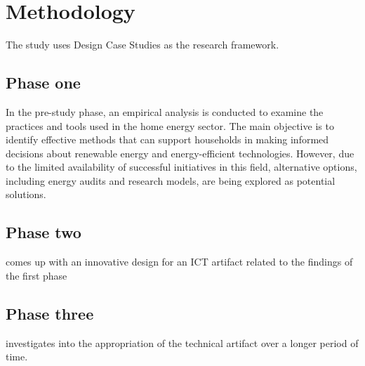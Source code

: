 \chapter{Methodology} 

The study uses Design Case Studies \cite{dcs} as the research framework. 


\section{Phase one}

In the pre-study phase, 
an empirical analysis is conducted to examine the practices and tools used in the home energy sector. 
The main objective is to identify effective methods that can support households in making informed decisions about renewable energy and energy-efficient technologies. 
However, due to the limited availability of successful initiatives in this field, alternative options, including energy audits and research models, are being explored as potential solutions. 


\section{Phase two}

comes up with an innovative design for an ICT artifact related to the findings of the first phase


\section{Phase three}

investigates into the appropriation of the technical artifact over a longer period of time. 

